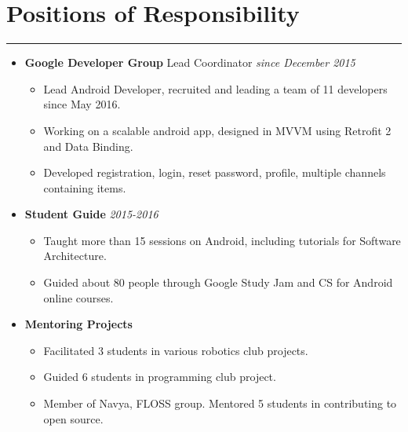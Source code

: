 \documentclass[a4paper]{article}
\begin{document}
\section*{Positions of Responsibility}
\hrule
\vspace{3mm}
\begin{itemize}
	\item
	      \textbf{Google Developer Group} Lead Coordinator
	      \hfill \textit{since December 2015}
	      \begin{itemize}
	      	\vspace{-2mm} \setlength\itemsep{-0.2em}
	      	\item Lead Android Developer, recruited and leading a team of 11 developers since May 2016.
	      	\item Working on a scalable android app, designed in MVVM using Retrofit 2 and Data Binding.
	      	\item Developed registration, login, reset password, profile, multiple channels containing items.
	      \end{itemize}
	\item
	      \textbf{Student Guide}
	      \hfill \textit{2015-2016}
	      \begin{itemize}
	      	\vspace{-2mm} \setlength\itemsep{-0.2em}
	      	\item Taught more than 15 sessions on Android, including tutorials for Software Architecture.
	      	\item Guided about 80 people through Google Study Jam and CS for Android online courses.
	      \end{itemize}
	\item
	      \textbf{Mentoring Projects}
	      \begin{itemize}
	      	\vspace{-2mm} \setlength\itemsep{-0.2em}
	      	\item Facilitated 3 students in various robotics club projects.
	      	\item Guided 6 students in programming club project.
	      	\item Member of Navya, FLOSS group. Mentored 5 students in contributing to open source.
	      \end{itemize}
\end{itemize}

\end{document}
